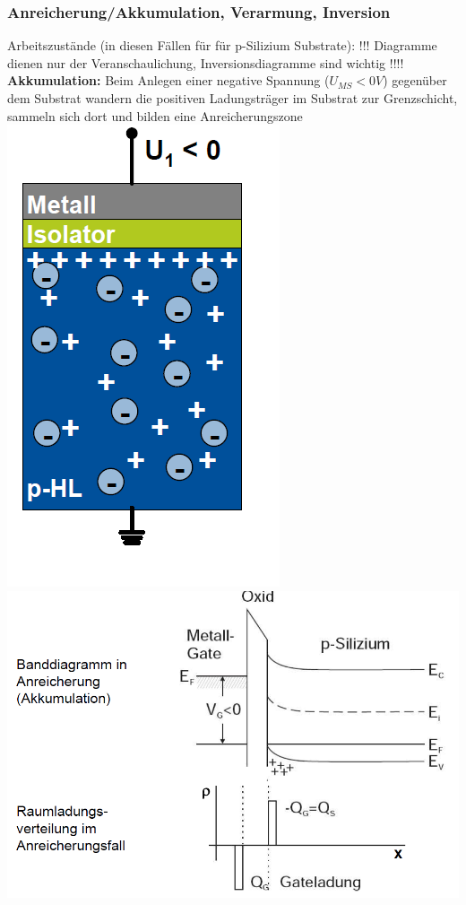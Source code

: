 	\subsubsection{Anreicherung/Akkumulation, Verarmung, Inversion}
		Arbeitszustände (in diesen Fällen für für p-Silizium Substrate):
		\newline
		!!! Diagramme dienen nur der Veranschaulichung, Inversionsdiagramme sind wichtig !!!!
		\newline
		\textbf{Akkumulation:}
		\newline
		Beim Anlegen einer negative Spannung ($U_{MS} < 0 V $) gegenüber dem Substrat wandern die positiven Ladungsträger im Substrat zur 		Grenzschicht, sammeln sich dort und bilden eine Anreicherungszone
		\newline
		\includegraphics[width=0.25\linewidth]{Kapitel/Kap06/Akkumulation1}		
		\includegraphics[width=0.60\linewidth]{Kapitel/Kap06/Akkumulation}
		\newline
		\newline
		
